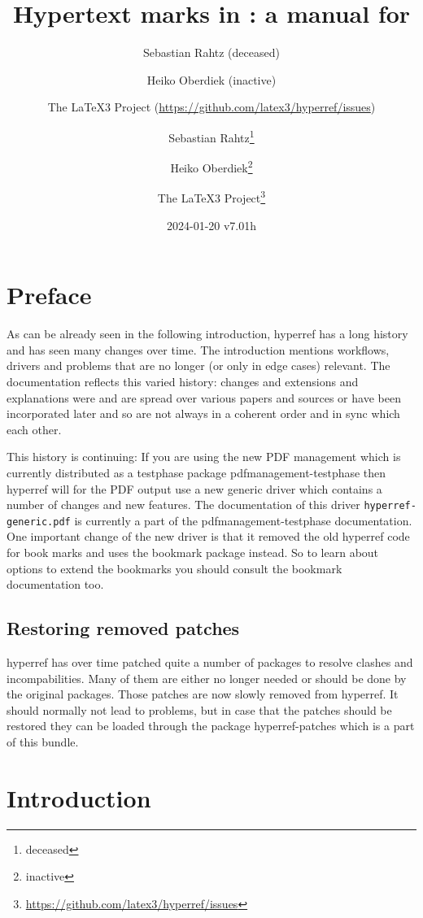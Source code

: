 \documentclass{article}
\author{Sebastian Rahtz (deceased)\and
       Heiko Oberdiek (inactive)\and
       The \LaTeX3 Project (\url{https://github.com/latex3/hyperref/issues})}
\author{Sebastian Rahtz\thanks{deceased}\and
       Heiko Oberdiek\thanks{inactive}\and
       The \LaTeX3 Project\thanks{\url{https://github.com/latex3/hyperref/issues}}}
\title{Hypertext marks in \hologo{LaTeX}: a manual for \xpackage{hyperref}}
\date{2024-01-20 v7.01h}
\newcommand*{\xpackage}[1]{\textsf{#1}}
\begin{document}
\thispagestyle{empty}
\maketitle
\tableofcontents
\setcounter{tocdepth}{2}%

\section{Preface}
As can be already seen in the following introduction, \xpackage{hyperref}
has a long history and has seen many changes over time. The introduction
mentions workflows, drivers and problems that are no longer (or only in edge cases) relevant.
The documentation reflects this varied history: changes
and extensions and explanations were and are spread over various papers and sources or
have been incorporated later and so are not always in a coherent order and in sync which each other.

This history is continuing: If you are using the new  PDF management
which is currently distributed as a testphase package \xpackage{pdfmanagement-testphase}
then \xpackage{hyperref} will for the PDF output use a new generic driver which
contains a number of changes and new features. The documentation of this driver
\texttt{hyperref-generic.pdf}
is currently a part of the \xpackage{pdfmanagement-testphase} documentation.
One important change of the new driver is
that it removed the old \xpackage{hyperref} code for book marks and uses
the \xpackage{bookmark} package instead. So to learn
about options to extend the bookmarks you should consult the \xpackage{bookmark} documentation
too.

\subsection{Restoring removed patches}

\xpackage{hyperref} has over time patched quite a number of packages to resolve clashes and incompabilities.
Many of them are either no longer needed or should be done by the original packages.
Those patches are now slowly removed from \xpackage{hyperref}.  It should normally not lead to problems, but
in case that the patches should be restored they can be loaded through the package \xpackage{hyperref-patches} which
is a part of this bundle.



\section{Introduction}
\end{document}
